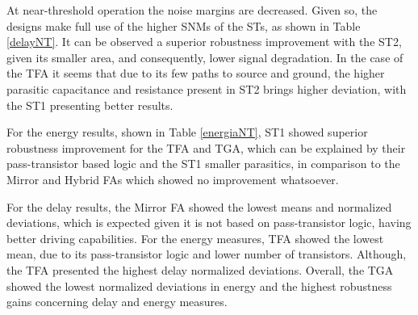 \documentclass[pgmicro,mestrado,english]{iiufrgs}
\begin{document}
 At near-threshold operation the noise margins are decreased. Given so, the designs make full use of the higher SNMs of the STs, as shown in Table \ref{delayNT}. It can be observed a superior robustness improvement with the ST2, given its smaller area, and consequently, lower signal degradation. In the case of the TFA it seems that due to its few paths to source and ground, the higher parasitic capacitance and resistance present in ST2 brings higher deviation, with the ST1 presenting better results.

 For the energy results, shown in Table \ref{energiaNT}, ST1 showed superior robustness improvement for the TFA and TGA, which can be explained by their pass-transistor based logic and the ST1 smaller parasitics, in comparison to the Mirror and Hybrid FAs which showed no improvement whatsoever.

 For the delay results, the Mirror FA showed the lowest means and normalized deviations, which is expected given it is not based on pass-transistor logic, having better driving capabilities. For the energy measures, TFA showed the lowest mean, due to its pass-transistor logic and lower number of transistors. Although, the TFA presented the highest delay normalized deviations. Overall, the TGA showed the lowest normalized deviations in energy and the highest robustness gains concerning delay and energy measures.
\end{document}
